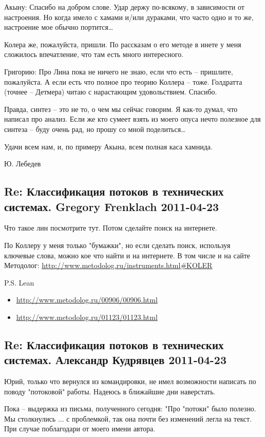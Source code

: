 \documentclass[a4paper,11pt]{article}
\begin{document}
Акыну: Спасибо на добром слове. Удар держу по-всякому, в зависимости от
настроения. Но когда имело с хамами и/или дураками, что часто одно и то же,
настроение мое обычно портится…

Колера же, пожалуйста, пришли. По рассказам о его методе в инете у меня
сложилось впечатление, что там есть много интересного.

Григорию: Про Лина пока не ничего не знаю, если что есть – пришлите,
пожалуйста. А если есть что полное про теорию Коллера – тоже. Голдратта
(точнее – Детмера) читаю с нарастающим удовольствием. Спасибо.

Правда, синтез – это не то, о чем мы сейчас говорим. Я как-то думал, что
написал про анализ. Если же кто сумеет взять из моего опуса нечто полезное для
синтеза – буду очень рад, но прошу со мной поделиться…

Удачи всем нам, и, по примеру Акына, всем полная каса хамнида.

Ю. Лебедев

\subsection*{Re: Классификация потоков в технических системах.  Gregory
  Frenklach 2011-04-23}

Что такое лин посмотрите тут.  Потом сделайте поиск на интернете.

По Коллеру у меня только "бумажки", но если сделать поиск, используя ключевые
слова, можно кое что найти и на интернете.  В том числе и на сайте
Методолог: \url{http://www.metodolog.ru/instruments.html#KOLER}

P.S. Lean
\begin{itemize}
\item \url{http://www.metodolog.ru/00906/00906.html}
\item \url{http://www.metodolog.ru/01123/01123.html}
\end{itemize}

\subsection*{Re: Классификация потоков в технических системах.  Александр
  Кудрявцев 2011-04-23}

Юрий, только что вернулся из командировки, не имел возможности написать по
поводу "потоковой" работы. Надеюсь в ближайшие дни наверстать.

Пока -- выдержка из письма, полученного сегодня: "Про "потоки" было полезно.
Мы столкнулись ... с проблемкой, так она почти без изменений легла на текст.
При случае поблагодари от моего имени автора.
\end{document}
